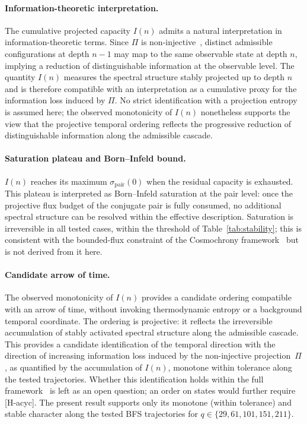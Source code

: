 \documentclass[11pt,a4paper]{article}
\begin{document}
  \paragraph{Information-theoretic interpretation.}
    The cumulative projected capacity $I(n)$ admits a natural interpretation in
    information-theoretic terms.
    Since $\Pi$ is non-injective~\cite{Beau2026l}, distinct admissible configurations
    at depth $n-1$ may map to the same observable state at depth $n$, implying a
    reduction of distinguishable information at the observable level.
    The quantity $I(n)$ measures the spectral structure stably projected up to depth $n$
    and is therefore compatible with an interpretation as a cumulative proxy for the
    information loss induced by $\Pi$.
    No strict identification with a projection entropy is assumed here;
    the observed monotonicity of $I(n)$ nonetheless supports the view that the
    projective temporal ordering reflects the progressive reduction of distinguishable
    information along the admissible cascade.

  \paragraph{Saturation plateau and Born--Infeld bound.}
    $I(n)$ reaches its maximum $\sigma_{\mathrm{pair}}(0)$ when the
    residual capacity is exhausted.
    This plateau is interpreted as Born--Infeld saturation at the pair
    level: once the projective flux budget of the conjugate pair is fully
    consumed, no additional spectral structure can be resolved within the
    effective description.
    Saturation is irreversible in all tested cases, within the threshold of Table~\ref{tab:stability}; this is consistent with
    the bounded-flux constraint of the Cosmochrony
    framework~\cite{Beau2026a} but is not derived from it here.

  \paragraph{Candidate arrow of time.}
    The observed monotonicity of $I(n)$ provides a candidate ordering
    compatible with an arrow of time, without invoking thermodynamic entropy
    or a background temporal coordinate.
    The ordering is projective: it reflects the irreversible accumulation
    of stably activated spectral structure along the admissible cascade.
    This provides a candidate identification of the temporal direction with the
    direction of increasing information loss induced by the non-injective projection~$\Pi$,
    as quantified by the accumulation of $I(n)$, monotone within tolerance along the tested trajectories.
    Whether this identification holds within the full
    framework~\cite{Beau2026a} is left as an open question; an order on states
    would further require [H-acyc].
    The present result supports only its monotone (within tolerance) and stable character along the
    tested BFS trajectories for $q \in \{29, 61, 101, 151, 211\}$.
\end{document}

